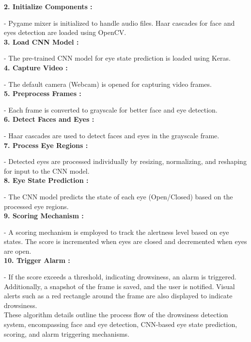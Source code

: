 \documentclass[12pt]{article}
\begin{document}
\textbf{2. Initialize Components : }

- Pygame mixer is initialized to handle audio files. Haar cascades for face and eyes detection are loaded using OpenCV.\\
   
\textbf{3. Load CNN Model :} 

- The pre-trained CNN model for eye state prediction is loaded using Keras.\\
   
\textbf{4. Capture Video : } 

- The default camera (Webcam) is opened for capturing video frames.\\
   
\textbf{5. Preprocess Frames :} 

- Each frame is converted to grayscale for better face and eye detection.\\
   
\textbf{6. Detect Faces and Eyes :}

- Haar cascades are used to detect faces and eyes in the grayscale frame.\\
   
\textbf{7. Process Eye Regions :}

- Detected eyes are processed individually by resizing, normalizing, and reshaping for input to the CNN model.\\
   
\textbf{8. Eye State Prediction :}

- The CNN model predicts the state of each eye (Open/Closed) based on the processed eye regions.\\
   
\textbf{9. Scoring Mechanism :}

- A scoring mechanism is employed to track the alertness level based on eye states. The score is incremented when eyes are closed and decremented when eyes are open.\\
   
\textbf{10. Trigger Alarm :}

- If the score exceeds a threshold, indicating drowsiness, an alarm is triggered. Additionally, a snapshot of the frame is saved, and the user is notified. Visual alerts such as a red rectangle around the frame are also displayed to indicate drowsiness.\\


These algorithm details outline the process flow of the drowsiness detection system, encompassing face and eye detection, CNN-based eye state prediction, scoring, and alarm triggering mechanisms.
\newpage
\end{document}
